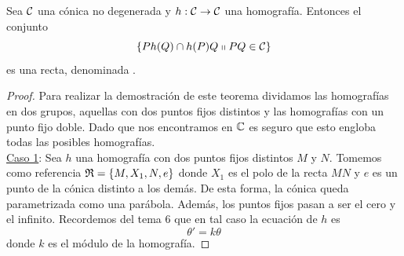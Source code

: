 \begin{theo}
	Sea $\mathcal{C}$ una cónica no degenerada y $h:\mathcal{C}\rightarrow\mathcal{C}$ una homografía. Entonces el conjunto
	\begin{equation}
		\{Ph(Q)\cap h(P)Q\shortparallel PQ\in\mathcal{C}\}
	\end{equation}
	es una recta, denominada .
\end{theo}
\begin{proof}
	Para realizar la demostración de este teorema dividamos las homografías en dos grupos, aquellas con dos puntos fijos distintos y las homografías con un punto fijo doble. Dado que nos encontramos en $\mathbb{C}$ es seguro que esto engloba todas las posibles homografías.\\
	
	\underline{Caso 1}: Sea $h$ una homografía con dos puntos fijos distintos $M$ y $N$. Tomemos como referencia $\mathfrak{R}=\{M,X_1,N,e\}$ donde $X_1$ es el polo de la recta $MN$ y $e$ es un punto de la cónica distinto a los demás. De esta forma, la cónica queda parametrizada como una parábola. Además, los puntos fijos pasan a ser el cero y el infinito. Recordemos del tema $6$ que en tal caso la ecuación de $h$ es 
	\[\theta'=k\theta\]
	donde $k$ es el módulo de la homografía.
	

\end{proof}
